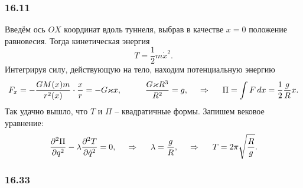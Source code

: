 


\subsubsection*{16.11}

Введём ось $OX$ координат вдоль туннеля, выбрав в качестве $x=0$ положение равновесия. Тогда кинетическая энергия
\begin{equation*}
    T = \frac{1}{2} m \dot{x}^2.
\end{equation*}
Интегрируя силу, действующую на тело, находим потенциальную энергию
\begin{equation*}
    F_x = -\frac{G M(x) m}{r^2(x)} \cdot \frac{x}{r} = - G \varkappa x,
    \hspace{1 cm}
    \frac{G \varkappa R^3}{R^2} = g,
    \hspace{0.5cm} \Rightarrow \hspace{0.5cm}
    \Pi = \int F \, d x = \frac{1}{2}\frac{g}{R} x.
\end{equation*}
Так удачно вышло, что $T$ и $\Pi$ -- квадратичные формы. Запишем вековое уравнение:
\begin{equation*}
     \frac{\partial^2 \Pi}{\partial q^2} - \lambda \frac{\partial^2 T}{\partial \dot{q}^2} = 0,
     \hspace{0.5cm} \Rightarrow \hspace{0.5cm}
     \lambda = \frac{g}{R},
     \hspace{0.5cm} \Rightarrow \hspace{0.5cm}
     T = 2 \pi \sqrt{\frac{R}{g}}.
\end{equation*}


\subsubsection*{16.33}

